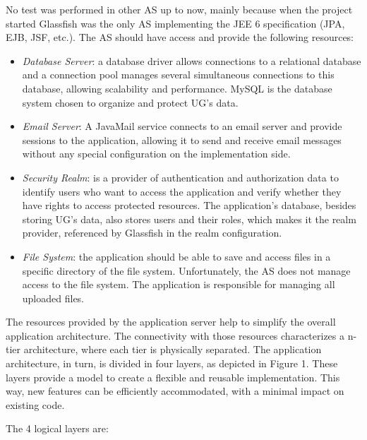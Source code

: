 \documentclass[envcountsame,envcountchap,letterpaper]{svmono}
\begin{document}
No test was performed in other AS up to now, mainly because when the project started Glassfish was the only AS implementing the JEE 6 specification (JPA, EJB, JSF, etc.). The AS should have access and provide the following resources:

\begin{itemize}
\item \textit{Database Server}: a database driver allows connections to a relational database and a connection pool manages several simultaneous connections to this database, allowing scalability and performance. MySQL is the database system chosen to organize and protect UG's data.

\item \textit{Email Server}: A JavaMail service connects to an email server and provide sessions to the application, allowing it to send and receive email messages without any special configuration on the implementation side.

\item \textit{Security Realm}: is a provider of authentication and authorization data to identify users who want to access the application and verify whether they have rights to access protected resources.  The application's database, besides storing UG's data, also stores users and their roles, which makes it the realm provider, referenced by Glassfish in the realm configuration.

\item \textit{File System}: the application should be able to save and access files in a specific directory of the file system. Unfortunately, the AS does not manage access to the file system. The application is responsible for managing all uploaded files.
\end{itemize}

The resources provided by the application server help to simplify the overall application architecture. The connectivity with those resources characterizes a n-tier architecture, where each tier is physically separated. The application architecture, in turn, is divided in four layers, as depicted in Figure 1. These layers provide a model to create a flexible and reusable implementation. This way, new features can be efficiently accommodated, with a minimal impact on existing code.

The 4 logical layers are:
\end{document}
